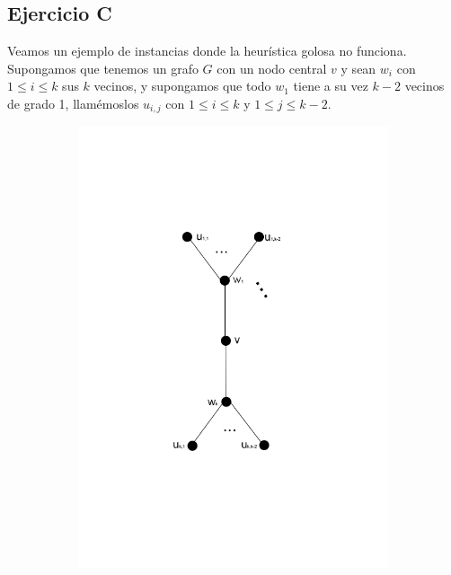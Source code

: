 \subsection{Ejercicio C}

Veamos un ejemplo de instancias donde la heurística golosa no funciona. Supongamos que tenemos un grafo $G$ con un nodo central $v$ y sean $w_i$ con $1 \leq i \leq k$ sus $k$ vecinos, y supongamos que todo $w_1$ tiene a su vez $k-2$ vecinos de grado 1, llamémoslos $u_{i,j}$ con $1 \leq i \leq k$ y $1 \leq j \leq k-2$. \\

\begin{figure}[H]
	\centering
	\begin{subfigure}[b]{0.5\textwidth}
                \includegraphics[width=\textwidth]{imagenes/grafos-ej3-tp3-1.png}
                \caption{}
        \end{subfigure}%
\end{figure}



